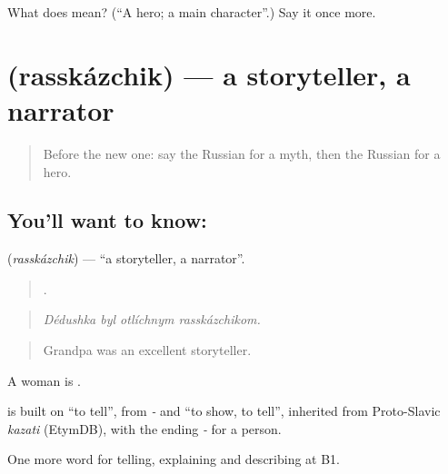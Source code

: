 \begin{tcolorbox}[breakable,colback=teal!4,colframe=teal!35!black,title={Before you move on}]
What does  mean? (\textquotedblleft{}A hero; a main character\textquotedblright{}.) Say it once more.
\end{tcolorbox}
\section[\texorpdfstring{\ru{рассказчик} (rasskázchik)}{рассказчик (rasskázchik)}]{ (rasskázchik) — a storyteller, a narrator}

\label{lesson:RU-C319-rasskazchik}



\begin{quote}
Before the new one: say the Russian for a myth, then the Russian for a hero.
\end{quote}

\subsection*{You'll want to know: }
\textbf{} (\emph{rasskázchik}) — \textquotedblleft{}a storyteller, a narrator\textquotedblright{}.

\begin{quote}
   .
\end{quote}

\begin{quote}
\emph{Dédushka byl otlíchnym rasskázchikom.}
\end{quote}

\begin{quote}
Grandpa was an excellent storyteller.
\end{quote}

A woman is \emph{}.

\begin{cousinweb}
\emph{} is built on \emph{} \textquotedblleft{}to tell\textquotedblright{}, from \emph{-} and \emph{} \textquotedblleft{}to show, to tell\textquotedblright{}, inherited from Proto-Slavic \emph{kazati} (EtymDB), with the ending \emph{-} for a person.
\end{cousinweb}

\begin{grammarlens}[title={What you've built}]
One more word for telling, explaining and describing at B1.
\end{grammarlens}

